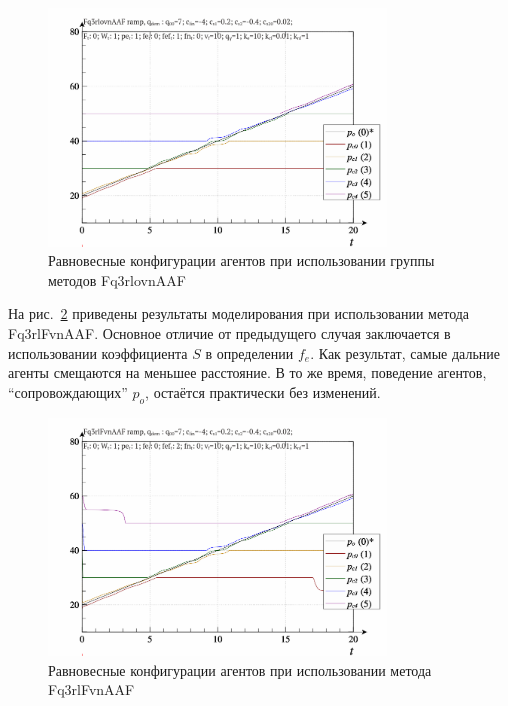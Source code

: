 \begin{figure}[htb!]
  \centerline{
    \includegraphics[width=0.8\textwidth]{p/ramp/qls-p_t_pi_Fq3rlovnAAF_ramp.png}
  }
  \caption{Равновесные конфигурации агентов при использовании группы методов Fq3rlovnAAF}
  \label{atu:f:qls_ramp_Fq3rlovnAAF}
\end{figure}

На рис.~\ref{atu:f:qls_ramp_Fq3rlFvnAAF} приведены результаты моделирования
при использовании метода Fq3rlFvnAAF.
Основное отличие от предыдущего
случая заключается в использовании коэффициента $S$ в определении $f_e$.
Как результат, самые дальние агенты смещаются на меньшее расстояние.
В то же время, поведение агентов, ``сопровождающих'' $p_o$,
остаётся практически без изменений.


\begin{figure}[htb!]
  \centerline{
    \includegraphics[width=0.8\textwidth]{p/ramp/qls-p_t_pi_Fq3rlFvnAAF_ramp.png}
  }
  \caption{Равновесные конфигурации агентов при использовании метода Fq3rlFvnAAF}
  \label{atu:f:qls_ramp_Fq3rlFvnAAF}
\end{figure}

